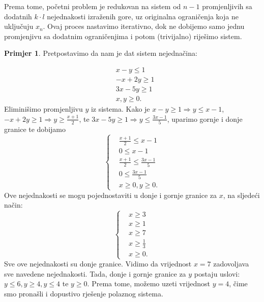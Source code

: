 \documentclass[a4paper, utf8, 11pt, colorlinks]{book}
\theoremstyle{definition}
\newtheorem{primjer}{Primjer}[chapter]
\begin{document}
Prema tome, početni problem je redukovan na sistem od $n-1$ promjenljivih sa dodatnih  $k \cdot l$ nejednakosti izraženih gore, uz originalna ograničenja koja ne uključuju $x_n$. Ovaj proces nastavimo iterativno, dok ne dobijemo samo jednu promjenjivu sa dodatnim ograničenjima  i potom (trivijalno) riješimo sistem. 

\begin{primjer} Pretpostavimo da nam je dat sistem nejednačina:
	\end{primjer}
\begin{align*}
	 &x - y \leq 1 \\
	 &-x + 2y \geq 1 \\
	 & 3x - 5y \geq 1 \\
	 & x,y \geq 0.
\end{align*}
Eliminišimo promjenljivu $y$ iz sistema. Kako je $x-y \geq 1 \Rightarrow y \leq x -1 $, 
$-x + 2y \geq 1 \Rightarrow y \geq \frac{x+1}{2}$, te $ 3x - 5y \geq 1 \Rightarrow y \leq \frac{3x-1}{5}$, uparimo gornje i donje granice te dobijamo 
 $$
 \begin{cases}
 	&\frac{x+1}{2} \leq x-1 \\
 	& 0 \leq x-1 \\
 	& \frac{x+1}{2} \leq \frac{3x-1}{5} \\
 	& 0 \leq \frac{3x-1}{5} \\
 	& x \geq 0, y \geq 0.  	
 \end{cases}
 $$
Ove nejednakosti se mogu pojednostaviti u donje i gornje granice za $x$, na sljedeći način:
$$
\begin{cases}
    &x \geq 3 \\
    & x \geq 1 \\
    & x \geq 7 \\
    & x \geq \frac{1}{3} \\
    & x \geq 0.	
\end{cases}
$$
Sve ove nejednakosti su donje granice. Vidimo da vrijednost $x=7$ zadovoljava sve navedene nejednakosti.
Tada, donje i gornje granice za $y$ postaju uslovi: $y \leq 6, y \geq 4, y \leq 4$ te $y \geq 0$. Prema tome, možemo uzeti vrijednost $y=4$, čime smo pronašli i dopustivo rješenje polaznog sistema. 
\vspace{1.5cm}
\end{document}
